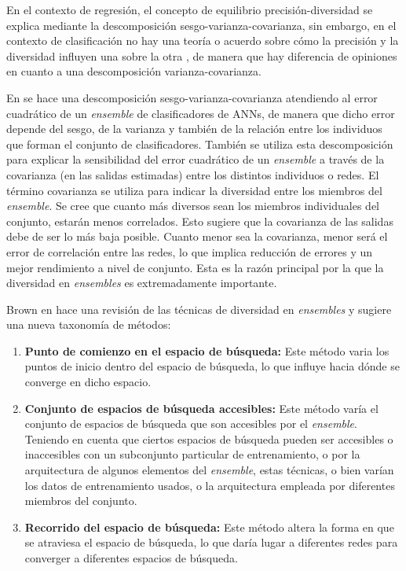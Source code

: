 \begin{description}
En el contexto de regresión, el concepto de equilibrio precisión-diversidad se
explica mediante la descomposición sesgo-varianza-covarianza, sin embargo, en el contexto
de clasificación no hay una teoría o acuerdo sobre cómo la precisión y la diversidad
influyen una sobre la otra \cite{Brown2005}, de manera que hay diferencia de opiniones en
cuanto a una descomposición varianza-covarianza.

En \cite{Chandra2004} se hace una descomposición sesgo-varianza-covarianza atendiendo al
error cuadrático de un \textit{ensemble} de clasificadores de ANNs, de manera que dicho
error depende del sesgo, de la varianza y también de la relación entre los individuos que
forman el conjunto de clasificadores. También se utiliza esta descomposición para
explicar la sensibilidad del error cuadrático de un \textit{ensemble} a través de la
covarianza (en las salidas estimadas) entre los distintos individuos o redes.	El término
covarianza se utiliza para indicar la diversidad entre los miembros del \textit{ensemble}.
Se cree que cuanto más diversos sean los miembros individuales del conjunto, estarán
menos correlados. Esto sugiere que la covarianza de las salidas debe de ser lo más baja
posible. Cuanto menor sea la covarianza, menor será el error de correlación
entre las redes, lo que implica reducción de errores y un mejor rendimiento a nivel de
conjunto. Esta es la razón principal por la que la diversidad en \textit{ensembles} es
extremadamente importante.

Brown en \cite{Brown2005} hace una revisión de las técnicas de diversidad en
\textit{ensembles} y sugiere una nueva taxonomía de métodos:
\begin{enumerate}
	\item \textbf{Punto de comienzo en el espacio de búsqueda:} Este método varia los
puntos de inicio dentro del espacio de búsqueda, lo que influye hacia dónde se
converge en dicho espacio.
   \item \textbf{Conjunto de espacios de búsqueda accesibles:} Este método varía el
conjunto de espacios de búsqueda que son accesibles por el \textit{ensemble}. Teniendo
en	cuenta que ciertos espacios de búsqueda pueden ser accesibles o inaccesibles con un
		subconjunto particular de entrenamiento, o por la arquitectura de algunos elementos
		del \textit{ensemble}, estas técnicas, o bien varían los datos de entrenamiento
		usados, o la arquitectura empleada por diferentes miembros del conjunto.
	\item \textbf{Recorrido del espacio de búsqueda:} Este método altera la forma en que
se atraviesa el espacio de búsqueda, lo que daría lugar a diferentes redes para converger
a diferentes espacios de búsqueda.
\end{enumerate}


\end{description}
